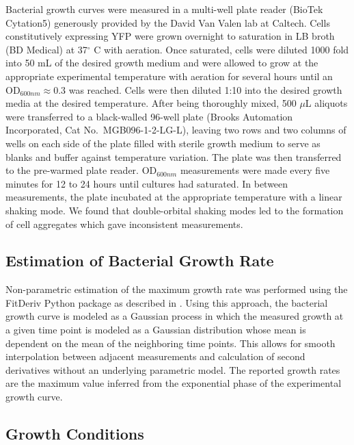 \documentclass[12pt]{caltech_thesis}
\begin{document}
Bacterial growth curves were measured in a multi-well plate reader
(BioTek Cytation5) generously provided by the David Van Valen lab at
Caltech. Cells constitutively expressing YFP were grown overnight to
saturation in LB broth (BD Medical) at 37\(^\circ\) C with aeration.
Once saturated, cells were diluted 1000 fold into 50 mL of the desired
growth medium and were allowed to grow at the appropriate experimental
temperature with aeration for several hours until an
OD\(_{600nm} \approx 0.3\) was reached. Cells were then diluted 1:10
into the desired growth media at the desired temperature. After being
thoroughly mixed, 500 \(\mu\)L aliquots were transferred to a
black-walled 96-well plate (Brooks Automation Incorporated, Cat
No.~MGB096-1-2-LG-L), leaving two rows and two columns of wells on each
side of the plate filled with sterile growth medium to serve as blanks
and buffer against temperature variation. The plate was then transferred
to the pre-warmed plate reader. OD\(_{600nm}\) measurements were made
every five minutes for 12 to 24 hours until cultures had saturated. In
between measurements, the plate incubated at the appropriate temperature
with a linear shaking mode. We found that double-orbital shaking modes
led to the formation of cell aggregates which gave inconsistent
measurements.

\hypertarget{estimation-of-bacterial-growth-rate}{%
\subsection{Estimation of Bacterial Growth
Rate}\label{estimation-of-bacterial-growth-rate}}

Non-parametric estimation of the maximum growth rate was performed using
the FitDeriv Python package as described in \textcite{swain2016}. Using
this approach, the bacterial growth curve is modeled as a Gaussian
process in which the measured growth at a given time point is modeled as
a Gaussian distribution whose mean is dependent on the mean of the
neighboring time points. This allows for smooth interpolation between
adjacent measurements and calculation of second derivatives without an
underlying parametric model. The reported growth rates are the maximum
value inferred from the exponential phase of the experimental growth
curve.

\hypertarget{growth-conditions}{%
\subsection{Growth Conditions}\label{growth-conditions}}
\end{document}
